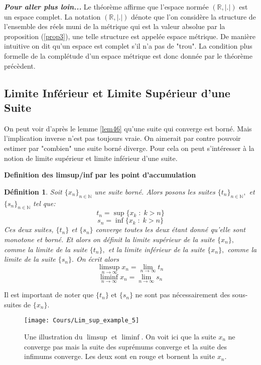 \documentclass[a4paper, 12pt, french, twoside]{article}
\newtheorem{defi}[theorem]{Définition}
\newcommand{\Nn}{{\mathbb{N}}}
\newcommand{\Rr}{{\mathbb{R}}}
\begin{document}
\textit{\textbf{Pour aller plus loin...}}
Le théorème affirme que l'espace normée $(\Rr, |.|)$ est un espace complet. La notation $(\Rr, |.|)$ dénote que l'on considère la structure de l'ensemble des réels muni de la métrique qui est la valeur absolue par la proposition (\ref{prop3}), une telle structure est appelée espace métrique. De manière intuitive on dit qu'un espace est complet s'il n'a pas de "trou". La condition plus formelle de la complétude d'un espace métrique est donc donnée par le théorème précèdent. 

\subsection{Limite Inférieur et Limite Supérieur d'une Suite}
On peut voir d'après le lemme \ref{lem46} qu'une suite qui converge est 
borné. Mais l'implication inverse n'est pas toujours vraie. On aimerait par contre pouvoir estimer par "combien" une suite borné diverge. 
Pour cela on peut s'intéresser à la notion de limite supérieur et limite inférieur d'une suite.


\textbf{Definition des limsup/inf par les point d'accumulation}
\begin{defi}
    Soit $\{x_n\}_{n\in \Nn}$ une suite borné. Alors posons  les suites $\{t_n\}_{n\in\Nn},$ et $\{s_n\}_{n\in \Nn}$ tel que:
    \[
    t_n = \sup\{x_k \; : \; k > n\}
    \]
    \[
    s_n = \inf\{x_k \; : \; k > n\}
    \]
    Ces deux suites, $\{t_n\}$ et $\{s_n\}$ converge toutes les deux 
    étant donné qu'elle sont monotone et borné. Et alors on définit la 
    limite supérieur de la suite $\{x_n\},$ comme la limite de la suite 
    $\{t_n\}, $ et la limite inférieur de la suite $\{x_n\},$ comme la 
    limite de la suite $\{s_n\}.$ On écrit alors 
    \[
    \limsup_{n \rightarrow \infty} x_n = \lim_{n \rightarrow \infty} t_n
    \]
    \[
    \liminf_{n \rightarrow \infty} x_n = \lim_{n \rightarrow \infty} s_n
    \]
    
\end{defi} 
Il est important de noter que $\{t_n\}$ et $\{s_n\}$ ne sont pas nécessairement des sous-suites de $\{x_n\}.$ 

\begin{figure}[H]
    \centering
    \texttt{[image: Cours/Lim\_sup\_example\_5]}
    \caption{Une illustration du $\limsup$ et $\liminf.$ 
    On voit ici que la suite $x_n$ ne converge pas mais la suite des suprémums converge et la suite des infimums converge. Les deux sont en rouge et bornent la suite $x_n$.}
    \label{fig:enter-label}
\end{figure}
\end{document}
